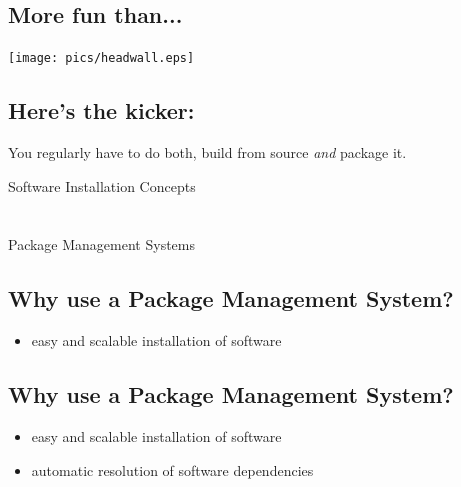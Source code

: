 \documentclass[xga]{xdvislides}
\begin{document}
\subsection{More fun than...}
\vspace*{\fill}
\begin{center}
	\texttt{[image: pics/headwall.eps]}
\end{center}

\subsection{Here's the kicker:}
\Huge
\vfill
\begin{center}
	You regularly have to do both, build from source {\em and} package it.
\end{center}
\vfill
\Normalsize

\newpage
\vspace*{\fill}
\begin{center}
	\Hugesize
		Software Installation Concepts \\ [1em]
	\hspace*{5mm}
	\blueline\\
	\hspace*{5mm}\\
		Package Management Systems
\end{center}
\vspace*{\fill}

%

\subsection{Why use a Package Management System?}
\begin{itemize}
	\item easy and scalable installation of software
\end{itemize}

\subsection{Why use a Package Management System?}
\begin{itemize}
	\item easy and scalable installation of software
	\item automatic resolution of software dependencies
\end{itemize}
\end{document}
